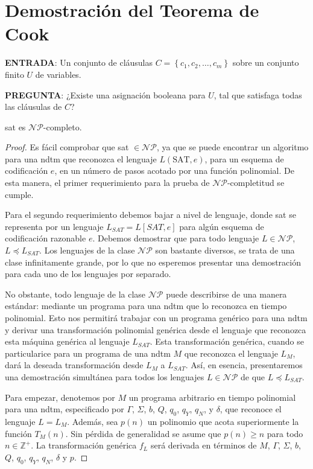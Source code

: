 \documentclass[a4paper, spanish, utf8]{memoir}
\begin{document}
\section{Demostración del Teorema de Cook}

\noindent \textbf{ENTRADA}: Un conjunto de cláusulas $C=\left \{c_1, c_2, \dots, c_m
\right \}$ sobre un conjunto finito $U$ de variables.

\noindent \textbf{PREGUNTA}: ¿Existe una asignación booleana para $U$, tal que satisfaga
todas las cláusulas de $C$?


\begin{thm}
  \gls{sat} es $\mathcal{NP}$-completo.
\end{thm}

\begin{proof}

  Es fácil comprobar que \gls{sat} $\in \mathcal{NP}$, ya que se puede encontrar
  un algoritmo para una \gls{ndtm} que reconozca el lenguaje $L(\mbox{SAT},e)$,
  para un esquema de codificación $e$, en un número de pasos acotado por una
  función polinomial. De esta manera, el primer requerimiento para la prueba de
  $\mathcal{NP}$-completitud se cumple.

  Para el segundo requerimiento debemos bajar a nivel de lenguaje, donde
  \gls{sat} se representa por un lenguaje $L_{SAT}=L[SAT,e]$ para algún esquema
  de codificación razonable $e$. Debemos demostrar que para todo lenguaje $L\in
  \mathcal{NP}$, $L \preceq L_{SAT}$. Los lenguajes de la clase $\mathcal{NP}$
  son bastante diversos, se trata de una clase infinitamente grande, por lo que
  no esperemos presentar una demostración para cada uno de los lenguajes por
  separado.

  No obstante, todo lenguaje de la clase $\mathcal{NP}$ puede describirse de una
  manera estándar: mediante un programa para una \gls{ndtm} que lo reconozca en
  tiempo polinomial. Esto nos permitirá trabajar con un programa genérico para
  una \gls{ndtm} y derivar una transformación polinomial genérica desde el
  lenguaje que reconozca esta máquina genérica al lenguaje $L_{SAT}$. Esta
  transformación genérica, cuando se particularice para un programa de una
  \gls{ndtm} $M$ que reconozca el lenguaje $L_M$, dará la deseada transformación
  desde $L_M$ a $L_{SAT}$. Así, en esencia, presentaremos una demostración
  simultánea para todos los lenguajes $L\in \mathcal{NP}$ de que $L \preceq
  L_{SAT}$.

  Para empezar, denotemos por $M$ un programa arbitrario en tiempo polinomial
  para una \gls{ndtm}, especificado por $\Gamma$, $\Sigma$, $b$, $Q$, $q_0$,
  $q_Y$, $q_N$, y $\delta$, que reconoce el lenguaje $L=L_M$. Además, sea $p(n)$
  un polinomio que acota superiormente la función $T_M(n)$. Sin pérdida de
  generalidad se asume que $p(n)\ge n$ para todo $n\in \mathbb{Z}^+$. La
  transformación genérica $f_L$ será derivada en términos de $M$, $\Gamma$,
  $\Sigma$, $b$, $Q$, $q_0$, $q_Y$, $q_N$, $\delta$ y $p$.


\end{proof}
\end{document}
